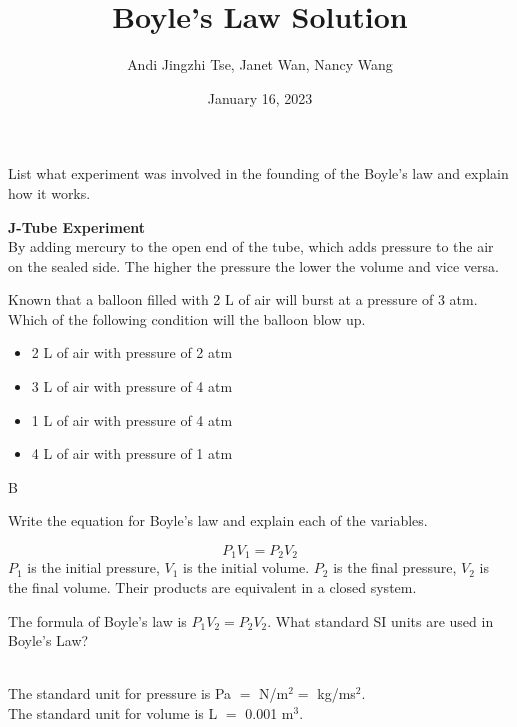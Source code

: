 \documentclass{article}
\title{Boyle's Law Solution}
\author{Andi Jingzhi Tse, Janet Wan, Nancy Wang}
\date{January 16, 2023}
\begin{document}
\maketitle
\begin{custom-big}[Example 1]
List what experiment was involved in the founding of the Boyle’s law and explain how it works.
\end{custom-big}
\begin{solution}
\textbf{J-Tube Experiment}\\
By adding mercury to the open end of the tube, which adds pressure to the air on the sealed side. The higher the pressure the lower the volume and vice versa. 
\end{solution}

\begin{custom-big}[Example 2]
Known that a balloon filled with 2 L of air will burst at a pressure of 3 atm. Which of the following condition will the balloon blow up. 
\begin{itemize}
    \item[(A)] 2 L of air with pressure of 2 atm
    \item[(B)] 3 L of air with pressure of 4 atm
    \item[(C)] 1 L of air with pressure of 4 atm
    \item[(D)] 4 L of air with pressure of 1 atm
\end{itemize}
\end{custom-big}
\begin{solution}
B
\end{solution}

\begin{custom-big}[Example 3]
Write the equation for Boyle’s law and explain each of the variables.
\end{custom-big}
\begin{solution}
\[P_1V_1=P_2V_2\]
$P_1$ is the initial pressure, $V_1$ is the initial volume. $P_2$ is the final pressure, $V_2$ is the final volume. Their products are equivalent in a closed system. 
\end{solution}


\pagebreak
\begin{custom-big}[Example 4]
The formula of Boyle's law is $P_1V_2=P_2V_2$. What standard SI units are used in Boyle's Law?
\end{custom-big}
\begin{solution}\\
The standard unit for pressure is Pa $=$ N/m$^2=$ kg/ms$^2$.\\
The standard unit for volume is L $=$ 0.001 m$^3$.
\end{solution}
\end{document}
